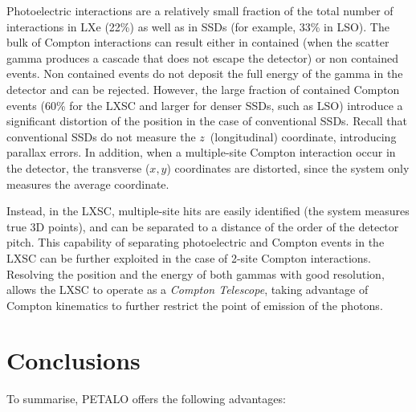 \documentclass{JINST}
\begin{document}
Photoelectric interactions are a relatively small fraction of the total number of interactions in LXe (22\%) as well as in SSDs (for example, 33\% in LSO). The bulk of Compton interactions can result either in contained (when the scatter gamma produces a cascade that does not escape the detector) or non contained events. Non contained events do not deposit the full energy of the gamma in the detector and can be rejected. However, the large fraction of contained Compton events (60\% for the LXSC and larger for denser SSDs, such as LSO) introduce a significant distortion of the position in the case of conventional SSDs. Recall that conventional SSDs do not measure the $z$~(longitudinal) coordinate, introducing parallax errors. In addition, when a multiple-site Compton interaction occur in the detector, the transverse ($x,y$) coordinates are distorted, since the system only measures the average coordinate. 

Instead, in the LXSC, multiple-site hits are easily identified (the system measures true 3D points), and can be separated to a distance of the order of the detector pitch. This capability of separating photoelectric and Compton events in the LXSC can be further exploited in the case of 2-site Compton interactions. Resolving the position and the energy of both gammas with good resolution, allows the LXSC to operate as a {\em Compton Telescope}, taking advantage of Compton kinematics to further restrict the point of emission of the photons. 


\section{Conclusions}
\label{sec.conclu}

To summarise, PETALO offers the following advantages:
\end{document}
